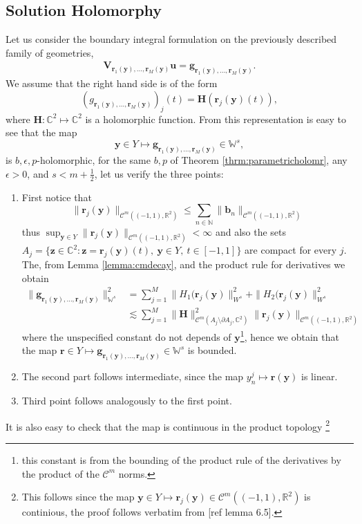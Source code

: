 \documentclass{article}
\newcommand{\todo}[1]{{\color{red}[#1]}}
\newcommand{\bg}{\bm{g}}
\newcommand{\IC}{{\mathbb C}}
\newcommand{\IN}{{\mathbb N}}
\newcommand{\IR}{{\mathbb R}}
\newcommand{\cmspace}[3]{\mathcal{C}^{#1} \left( #2, #3 \right)}
\newcommand{\bu}{\bm{u}}
\newcommand{\bz}{\bm{z}}
\newcommand{\br}{\bm{r}}
\newcommand{\by}{\bm{y}}
\newcommand{\bb}{\bm{b}}
\begin{document}
\subsection{Solution Holomorphy}
Let us consider the boundary integral formulation on the previously described family of geometries, 
\begin{align*}
\mathbf{V}_{\br_1(\by),\hdots,\br_M(\by)} \bu = \bg_{\br_1(\by),\hdots,\br_M(\by)}.
\end{align*}
We assume that the right hand side is of the form 
$$(g_{\br_1(\by),\hdots,\br_M(\by)})_j(t) = \mathbf{H}(\br_j(\by)(t)),$$
where $\mathbf{H} : \IC^2\mapsto \IC^2$ is a holomorphic function. From this representation is easy to see that the map 
$$\by \in Y \mapsto \bg_{\br_1(\by),\hdots,\br_M(\by)} \in \mathbb{W}^s,$$
is $b,\epsilon,p$-holomorphic, for the same $b,p$ of Theorem \ref{thrm:parametricholomr}, any $\epsilon >0$, and $s <m +\frac{1}{2}$, let us verify the three points: 
\begin{enumerate}
\item 
First notice that 
$$
\|\br_j(\by)\|_{\cmspace{m}{(-1,1)}{\IR^2}} \leq \sum_{n\in \IN} \|\bb_n\|_{\cmspace{m}{(-1,1)}{\IR^2}}
$$
 thus $\sup_{\by \in Y}\| \br_j(\by)\|_{\cmspace{m}{(-1,1)}{\IR^2}}< \infty$ and also the sets $A_j = \{ \bz \in \IC^2: \bz  = \br_j(\by)(t), \ \by \in Y,\ t \in [-1,1]\}$ are compact for every $j$. The, from Lemma \ref{lemma:cmdecay}, and the product rule for derivatives we obtain 
\begin{align*}
\| \bg_{\br_1(\by),\hdots,\br_M(\by)} \|_{\mathbb{W}^s}^2 &=\sum_{j=1}^M \| H_1(\br_j(\by) \|_{W^s}^2+ \| H_2(\br_j(\by) \|_{W^s}^2\\& \lesssim \sum_{j=1}^M \|\mathbf{H}\|^2_{\cmspace{m}{A_j \setminus \partial A_j}{\IC^2}} \| \br_j(\by)\|_{\cmspace{m}{(-1,1)}{\IR^2}}
\end{align*}
where the unspecified constant do not depends of $\by$\footnote{this constant is from the bounding of the product rule of the derivatives by the product of the $\mathcal{C}^{m}$ norms.}, hence we obtain that the map $\br \in Y \mapsto \bg_{\br_1(\by),\hdots,\br_M(\by)} \in \mathbb{W}^s$ is bounded. 
\item 
The second part follows intermediate, since the map $y^j_n \mapsto \br(\by)$ is linear. 
\item 
Third point follows analogously to the first point. 
\end{enumerate}
It is also easy to check that the map is continuous in the product topology \footnote{This follows since the map $\by \in Y \mapsto \br_j(\by) \in \cmspace{m}{(-1,1)}{\IR^2}$ is continious, the proof follows verbatim from \todo{ref lemma 6.5}.}
\end{document}

